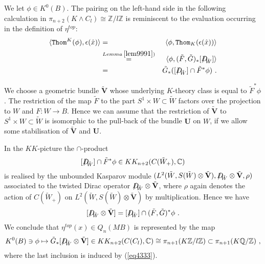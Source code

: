 \documentclass[12pt]{article}
\newcommand{\Thom}{{\tt Thom}}
\newcommand{\Z}{{\mathbb{Z}}}
\newcommand{\Q}{{\mathbb{Q}}}
\newcommand{\C}{{\mathbb{C}}}
\newcommand{\bV}{{\mathbf{V}}}
\newcommand{\bU}{{\mathbf{U}}}
\newcommand{\Dirac}{{D\hspace{-0.27cm}/}}
\begin{document}
 

We let $\phi\in K^{0}(B)$. The pairing on  the left-hand side in the following calculation in $\pi_{n+2}(K\wedge C_{l})\cong \Z/l\Z$ is reminiscent to the evaluation occurring in the definition of $\eta^{top}$:
\begin{eqnarray*} \langle \Thom^{K}(\phi),\epsilon(\hat x)\rangle &=&\langle  \phi, \Thom_{K}(\epsilon(\hat x))\rangle \\&\stackrel{Lemma\: \ref{lem9991})}{=} &\langle \phi,(\tilde F,\tilde G)_{*}[\Dirac_{\tilde W}]\rangle \\ &=&\tilde G_{*}  ([\Dirac_{\tilde W}]\cap \tilde F^{*}\phi)\ .\end{eqnarray*} 

We choose a geometric bundle $\tilde \bV$ whose underlying $K$-theory class is equal to $\tilde F^{*}\phi$. The restriction of the map $\tilde F$  to the part $S^{1}\times W\subset \tilde W$ factors over the projection to $W$ and $F:W\to B$. Hence we can assume that the restriction of $\tilde \bV$ to $S^{1}\times W\subset \tilde W$
is isomorphic to the pull-back of the bundle $\bU$ on $W$, if we allow some stabilisation of $\tilde \bV$ and $\bU$.


In the $KK$-picture the $\cap$-product
$$[\Dirac_{\tilde W}]\cap \tilde F^{*}\phi\in KK_{n+2}(C(\tilde W_{+}),\C)$$ is realised by the unbounded Kasparov module
$(L^{2}(\tilde W,  S(\tilde W)\otimes \tilde \bV),\Dirac_{\tilde W}\otimes \tilde \bV,\rho)$
 associated to the twisted Dirac operator
$\Dirac_{\tilde W}\otimes \tilde \bV$, where $\rho$ again denotes the action of $C(\tilde W_{+})$ on  $L^{2}(\tilde W,  S(\tilde W)\otimes \tilde \bV)$
by multiplication. Hence
we have
$$[\Dirac_{\tilde W}\otimes \tilde \bV]=[\Dirac_{\tilde W}]\cap (\tilde F,\tilde G)^{*}\phi\ .$$
We conclude that
$\eta^{top}(x)\in Q_{n}(MB)$ is represented by the map
\begin{equation}\label{eq62}K^{0}(B)\ni \phi\mapsto \tilde G_{*}[\Dirac_{\tilde W}\otimes \tilde \bV]\in KK_{n+2}(C(C_{l}),\C)\cong \pi_{n+1}(K\Z/l\Z)\subset \pi_{n+1}(K\Q/\Z)\ ,\end{equation}
where the last inclusion is induced by (\ref{eq4333}).
\end{document}
